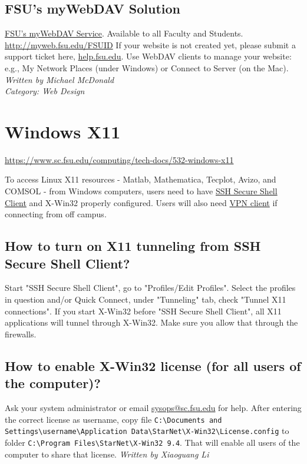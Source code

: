 \documentclass[12pt,a4paper]{article}
\begin{document}
\subsection*{FSU's myWebDAV Solution}
\href{https://its.fsu.edu/service-catalog/wi-fi-internet-access/mywebdav}{FSU's myWebDAV Service}. Available to all Faculty and Students.
\url{http://myweb.fsu.edu/FSUID}
If your website is not created yet, please submit a support ticket here, \url{help.fsu.edu}.
Use WebDAV clients to manage your website: e.g., My Network Places (under Windows) or Connect to Server (on the Mac).
\hfill \textit{Written by Michael McDonald} \\
\hfill \textit{Category: Web Design}

\section{Windows X11}
\url{https://www.sc.fsu.edu/computing/tech-docs/532-windows-x11}

To access Linux X11 resources - Matlab, Mathematica, Tecplot, Avizo, and COMSOL - from Windows computers, users need to have \href{http://www.sc.fsu.edu/software/win-ssh-client.php}{SSH Secure Shell Client} and X-Win32 properly configured. Users will also need \href{https://www.sc.fsu.edu/computing/tech-docs/204-vpn-access}{VPN client} if connecting from off campus.

\subsection*{How to turn on X11 tunneling from SSH Secure Shell Client?}
Start "SSH Secure Shell Client", go to "Profiles/Edit Profiles".
Select the profiles in question and/or Quick Connect, under "Tunneling" tab, check "Tunnel X11 connections".
If you start X-Win32 before "SSH Secure Shell Client", all X11 applications will tunnel through X-Win32. Make sure you allow that through the firewalls.

\subsection*{How to enable X-Win32 license (for all users of the computer)?}
Ask your system administrator or email \href{mailto:sysops@sc.fsu.edu}{sysops@sc.fsu.edu} for help.
After entering the correct license as username, copy file
\texttt{C:\textbackslash{}Documents and Settings\textbackslash{}username\textbackslash{}Application Data\textbackslash{}StarNet\textbackslash{}X-Win32\textbackslash{}License.config}
to folder
\texttt{C:\textbackslash{}Program Files\textbackslash{}StarNet\textbackslash{}X-Win32 9.4}.
That will enable all users of the computer to share that license.
\hfill \textit{Written by Xiaoguang Li}
\end{document}
